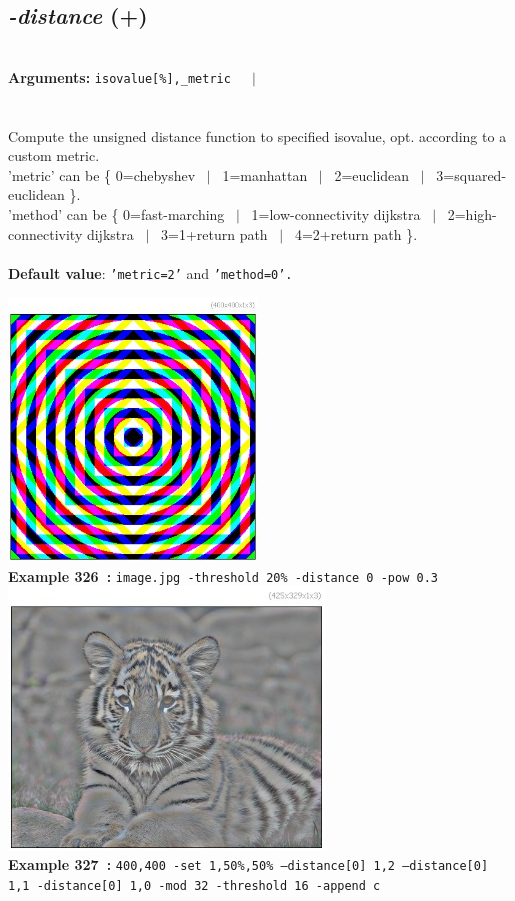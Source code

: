 \documentclass[a4paper,11pt,twoside]{book}
\begin{document}
\subsection{\emph{-distance} (+)}\vspace*{-0.5em}
~\\\textbf{Arguments: } 
{\small \texttt{isovalue[\%],\_metric}}~~~$|$\\
\\~\\
Compute the unsigned distance function to specified isovalue, opt. according to a custom metric.
~\\'metric' can be \{ 0=chebyshev ~$|$~ 1=manhattan ~$|$~ 2=euclidean ~$|$~ 3=squared-euclidean \}.
~\\'method' can be \{ 0=fast-marching ~$|$~ 1=low-connectivity dijkstra ~$|$~ 2=high-connectivity dijkstra ~$|$~ 3=1+return path ~$|$~ 4=2+return path \}.
~\\~\\\textbf{Default value}: {\small \texttt{'metric=2'} and \texttt{'method=0'.}}
\begin{center}\includegraphics[keepaspectratio=true,height=7cm,width=\textwidth]{img/gmic_def326.jpg}\\
{\footnotesize \textbf{Example 326~:} \texttt{image.jpg -threshold 20\% -distance 0 -pow 0.3}}
\\\includegraphics[keepaspectratio=true,height=7cm,width=\textwidth]{img/gmic_def327.jpg}\\
{\footnotesize \textbf{Example 327~:} \texttt{400,400 -set 1,50\%,50\% --distance[0] 1,2 --distance[0] 1,1 -distance[0] 1,0 -mod 32 -threshold 16 -append c}}
\end{center}
\end{document}
